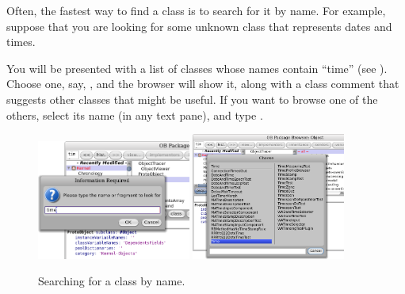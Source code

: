 \documentclass[a4paper,10pt,twoside]{book}
\begin{document}


Often, the fastest way to find a class is to search for it by name.  For example, suppose that you are looking for some unknown class that represents dates and times.

\noindent
You will be presented with a list of classes whose names contain ``time'' (see ).  Choose one, say, , and the browser will show it, along with a class comment that suggests other classes that might be useful.  If you want to browse one of the others, select its name (in any text pane), and type .

\begin{figure}[hbt]
\centerline{
	\includegraphics[width=0.45\textwidth]{FindIt}
	\hspace{1cm}
	\includegraphics[width=0.45\textwidth]{TimeClasses}
}
\caption{Searching for a class by name.
\label{fig:findit}}
\end{figure}
\end{document}
